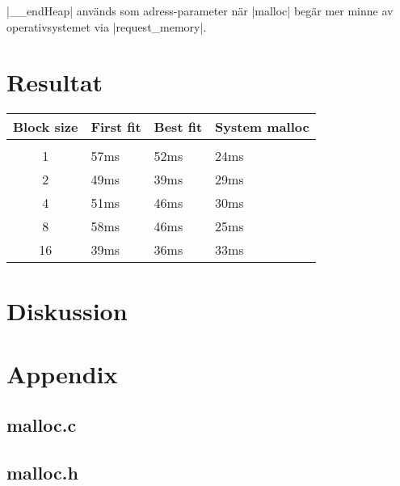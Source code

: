 \documentclass[paper=a4, fontsize=11pt]{scrartcl} %
\numberwithin{equation}{section} %
\numberwithin{figure}{section} %
\numberwithin{table}{section} %
\begin{document}
|__endHeap| används som adress-parameter när |malloc| begär mer minne av operativsystemet via |request_memory|.




\section{Resultat}


\begin{table}[h!] %
\begin{tabular}{ c l l l}
   Block size & First fit & Best fit & System malloc \\
  \hline \\
  1 & 57ms & 52ms & 24ms \\
  2 & 49ms & 39ms & 29ms \\
  4 & 51ms & 46ms & 30ms \\
  8 & 58ms & 46ms & 25ms \\
  16 & 39ms & 36ms & 33ms \\
\end{tabular}
\end{table}


\section{Diskussion}


\newpage
\section*{Appendix}
\subsection*{malloc.c}


\newpage
\subsection*{malloc.h}

\end{document}
